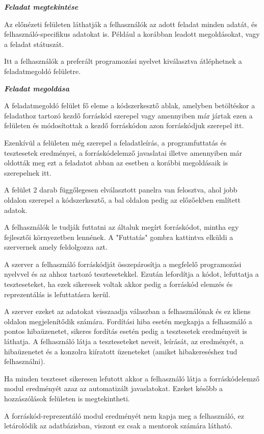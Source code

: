 \textbf{\textit{Feladat megtekintése}}

Az előnézeti felületen láthatják a felhasználók az adott feladat minden adatát, és felhasználó-specifikus adatokat is. Például a korábban leadott megoldásokat, vagy a feladat státuszát.

Itt a felhasználók a preferált programozási nyelvet kiválasztva átléphetnek a feladatmegoldó felületre.

\textbf{\textit{Feladat megoldása}}

A feladatmegoldó felület fő eleme a kódszerkesztő ablak, amelyben betöltéskor a feladathoz tartozó kezdő forráskód szerepel vagy amennyiben már jártak ezen a felületen és módosítottak a kezdő forráskódon azon forráskódjuk szerepel itt. 

Ezenkívül a felületen még szerepel a feladatleírás, a programfuttatás és tesztesetek eredményei, a forráskódelemző javaslatai illetve amennyiben már oldották meg ezt a feladatot abban az esetben a korábbi megoldásaik is szerepelnek itt.

A felület 2 darab függőlegesen elválasztott panelra van felosztva, ahol jobb oldalon szerepel a kódszerkesztő, a bal oldalon pedig az előzőekben említett adatok.

A felhasználók le tudják futtatni az általuk megírt forráskódot, mintha egy fejlesztői környezetben lennének. A "Futtatás" gombra kattintva elküldi a szervernek amely feldolgozza azt.

A szerver a felhasználó forráskódját összepárosítja a megfelelő programozási nyelvvel és az ahhoz tartozó tesztesetekkel. Ezután lefordítja a kódot, lefuttatja a teszteseteket, ha ezek sikeresek voltak akkor pedig a forráskód elemzés és reprezentálás is lefuttatásra kerül.

A szerver ezeket az adatokat visszaadja válaszban a felhasználónak és ez kliens oldalon megjelenítődik számára. Fordítási hiba esetén megkapja a felhasználó a pontos hibaüzenetet, sikeres fordítás esetén pedig a tesztesetek eredményeit is láthatja. A felhasználó látja a teszteseteket neveit, leírását, az eredményét, a hibaüzenetet és a konzolra kiíratott üzeneteket (amiket hibakereséshez tud felhasználni).

Ha minden teszteset sikeresen lefutott akkor a felhasználó látja a forráskódelemző modul eredményét azaz az automatizált javaslatokat. Ezeket később a hozzászólások felületen is megtekintheti.

A forráskód-reprezentáló modul eredményét nem kapja meg a felhasználó, ez letárolódik az adatbázisban, viszont ez csak a mentorok számára látható.

